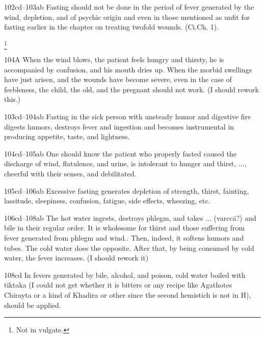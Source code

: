 \begin{translation}
    \item[102cd--103ab]  Fasting should not be done in the period of fever 
generated
    by the wind, depletion, and of psychic origin and even in those
    mentioned as unfit for fasting earlier in the chapter on treating
    twofold wounds. (Ci.Ch. 1).
    
    
    \footnote{Not in vulgate.}
    
    \item[104A]  When the wind blows, the patient feels hungry and thirsty, he is
    accompanied by confusion, and his mouth dries up. When the morbid
    swellings have just arisen, and the wounds have become severe, even in
    the case of feebleness, the child, the old, and the pregnant should not
    work. (I should rework this.)
    
    \item[103cd--104ab]  Fasting in the sick person with unsteady humor and
    digestive fire digests humors, destroys fever and ingestion and becomes
    instrumental in producing appetite, taste, and lightness.
    
    \item[104cd--105ab]  One should know the patient who properly fasted 
caused the
    discharge of wind, flatulence, and urine, is intolerant to hunger and
    thirst, ..., cheerful with
    their senses, and debilitated.
    
    
    \item[105cd--106ab]  Excessive fasting generates depletion of strength, 
thirst,
    fainting, lassitude, sleepiness, confusion, fatigue, side effects,
    wheezing, etc.
    
    \item[106cd--108ab]  The hot water ingests, destroys phlegm, and takes ...
    (varccā?) and bile in their regular order. It is wholesome for thirst
    and those suffering from fever generated from phlegm and wind.. Then,
    indeed, it softens humors and tubes. The cold water does the opposite.
    After that, by being consumed by cold water, the fever increases. (I
    should rework it)
    
    \item[108cd]  In fevers generated by bile, alcohol, and poison, cold water
    boiled with tiktaka (I could not get whether it is bitters or any recipe
    like Agathotes Chirayta or a kind of Khadira or other since the second
    hemistich is not in H), should be applied.
    

\end{translation}
